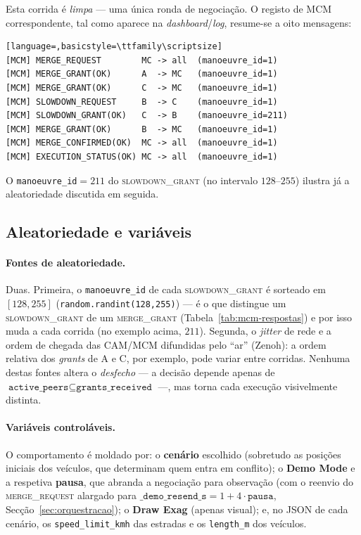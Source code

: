 \documentclass[11pt,a4paper]{article}
\begin{document}
Esta corrida é \emph{limpa} --- uma única ronda de negociação. O registo de MCM
correspondente, tal como aparece na \emph{dashboard}/\emph{log}, resume-se a oito
mensagens:

\begin{lstlisting}[language=,basicstyle=\ttfamily\scriptsize]
[MCM] MERGE_REQUEST        MC -> all  (manoeuvre_id=1)
[MCM] MERGE_GRANT(OK)      A  -> MC   (manoeuvre_id=1)
[MCM] MERGE_GRANT(OK)      C  -> MC   (manoeuvre_id=1)
[MCM] SLOWDOWN_REQUEST     B  -> C    (manoeuvre_id=1)
[MCM] SLOWDOWN_GRANT(OK)   C  -> B    (manoeuvre_id=211)
[MCM] MERGE_GRANT(OK)      B  -> MC   (manoeuvre_id=1)
[MCM] MERGE_CONFIRMED(OK)  MC -> all  (manoeuvre_id=1)
[MCM] EXECUTION_STATUS(OK) MC -> all  (manoeuvre_id=1)
\end{lstlisting}

O \texttt{manoeuvre\_id}$=211$ do \textsc{slowdown\_grant} (no intervalo
$128$--$255$) ilustra já a aleatoriedade discutida em seguida.

\subsection{Aleatoriedade e variáveis}
\label{sec:demo-rand}

\paragraph{Fontes de aleatoriedade.} Duas. Primeira, o \texttt{manoeuvre\_id} de cada
\textsc{slowdown\_grant} é sorteado em $[128,255]$ (\texttt{random.randint(128,255)}) ---
é o que distingue um \textsc{slowdown\_grant} de um \textsc{merge\_grant}
(Tabela~\ref{tab:mcm-respostas}) e por isso muda a cada corrida (no exemplo acima,
$211$). Segunda, o \emph{jitter} de rede e a ordem de chegada das CAM/MCM difundidas
pelo ``ar'' (Zenoh): a ordem relativa dos \emph{grants} de A e C, por exemplo, pode
variar entre corridas. Nenhuma destas fontes altera o \emph{desfecho} --- a decisão
depende apenas de $\texttt{active\_peers}\subseteq\texttt{grants\_received}$ ---, mas
torna cada execução visivelmente distinta.

\paragraph{Variáveis controláveis.} O comportamento é moldado por: o \textbf{cenário}
escolhido (sobretudo as posições iniciais dos veículos, que determinam quem entra em
conflito); o \textbf{Demo Mode} e a respetiva \textbf{pausa}, que abranda a negociação
para observação (com o reenvio do \textsc{merge\_request} alargado para
$\texttt{\_demo\_resend\_s}=1+4\cdot\texttt{pausa}$, Secção~\ref{sec:orquestracao}); o
\textbf{Draw Exag} (apenas visual); e, no JSON de cada cenário, os
\texttt{speed\_limit\_kmh} das estradas e os \texttt{length\_m} dos veículos.
\end{document}
